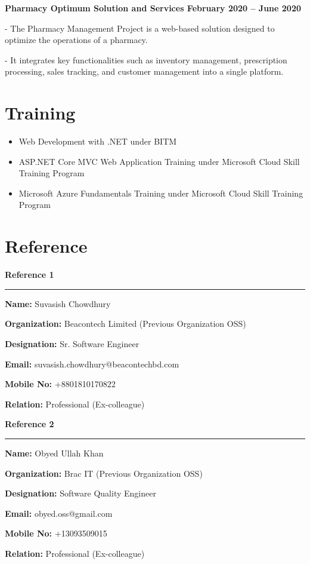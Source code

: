 \documentclass[a4paper,10pt]{article}
\newcommand{\cventry}[2]{%
  \par\vspace{0.7em}%
  \noindent\textbf{#1}\par
  \nopagebreak\vspace{0.2em}%
  \noindent\color{bodygray}#2\par
}
\newcommand{\cvref}[6]{%
  \noindent\textbf{#1}\par
  \vspace{0.2em}\noindent\textcolor{rulegray}{\rule{\linewidth}{1pt}}\par
  \vspace{0.5em}%
  \color{bodygray}%
  \textbf{Name:} #2\par\vspace{0.25em}
  \textbf{Organization:} #3\par\vspace{0.25em}
  \textbf{Designation:} #4\par\vspace{0.25em}
  \textbf{Email:} #5\par\vspace{0.25em}
  \textbf{Mobile No:} #6\par\vspace{0.25em}
  \textbf{Relation:} Professional (Ex-colleague)\par
}
\begin{document}
\cventry{Pharmacy \textbar{} Optimum Solution and Services \textbar{} February 2020 -- June 2020}{%
- The Pharmacy Management Project is a web-based solution designed to optimize the
operations of a pharmacy.\par
\vspace{0.25em}
- It integrates key functionalities such as inventory management, prescription processing,
sales tracking, and customer management into a single platform.}

\section{Training}

\begin{itemize}
  \item Web Development with .NET under BITM
  \item ASP.NET Core MVC Web Application Training under Microsoft Cloud Skill Training Program
  \item Microsoft Azure Fundamentals Training under Microsoft Cloud Skill Training Program
\end{itemize}

%
%

\section{Reference}

\noindent
\begin{minipage}[t]{0.47\linewidth}
  \cvref{Reference 1}
        {Suvasish Chowdhury}
        {Beacontech Limited (Previous Organization OSS)}
        {Sr. Software Engineer}
        {suvasish.chowdhury@beacontechbd.com}
        {+8801810170822}
\end{minipage}%
\hfill
\begin{minipage}[t]{0.47\linewidth}
  \cvref{Reference 2}
        {Obyed Ullah Khan}
        {Brac IT (Previous Organization OSS)}
        {Software Quality Engineer}
        {obyed.oss@gmail.com}
        {+13093509015}
\end{minipage}
\end{document}
